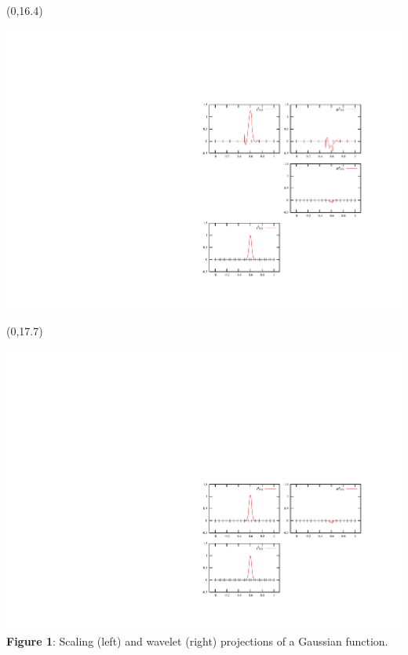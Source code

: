 \documentclass[a0,draft,portrait]{a0poster}
\begin{document}
\begin{textblock}{5}(0,16.4)
  \begin{center}
	\includegraphics[scale=1.45, viewport = 415 320 755 440, clip]{figures/decomp4.pdf}
  \end{center}
\end{textblock} 

\begin{textblock}{5}(0,17.7)
  \begin{center}
    \includegraphics[scale=1.45, viewport = 415 190 755 320, clip]{figures/decomp5.pdf}
    \footnotesize
    \\
    \textbf{Figure 1}: Scaling (left) and wavelet (right) projections of a Gaussian
    function.
  \end{center}
\end{textblock} 
\end{document}
